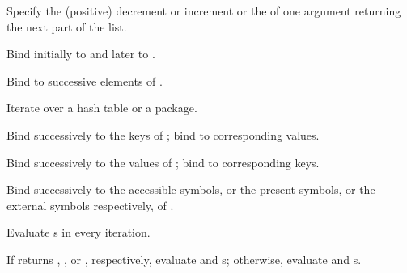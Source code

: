\begin{LIST}{1cm}
\begin{LIST}{.5cm}
\begin{LIST}{.5cm}
      {
        Specify the (positive) decrement or increment or the
         of one argument returning the next part of the
        list.
      }

      {
        Bind  initially to  and later to
        .
      }

      {
        Bind  to successive elements of .
      }

      {
        Iterate over a hash table or a package.
      }

      \begin{LIST}{.5cm}

        {
          Bind  successively to the keys of ;
          bind  to corresponding values.
        }

        {
          Bind  successively to the values of
          ; bind  to corresponding keys.
        }

        {
          Bind  successively to the accessible symbols, or
          the present symbols, or the external symbols respectively,
          of . 
        }

      \end{LIST}
    \end{LIST}
    
    {
      Evaluate s in every iteration.
    }

    {
      If  returns \T, \T, or \NIL, respectively, evaluate
       and s; otherwise, evaluate
       and s.
    }


\end{LIST}
\end{LIST}
